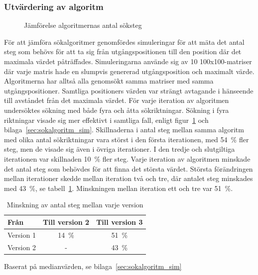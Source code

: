         

        \subsubsection{Utvärdering av algoritm} %
        \label{ssub:utvardering_av_algoritm}
            \begin{figure}[ht!]
                
            \caption{\label{fig:algoritm_steg} Jämförelse algoritmernas antal söksteg}
            \end{figure}

            För att jämföra sökalgoritmer genomfördes simuleringar för att mäta det antal steg som behövs för att ta sig från utgångspositionen till den position där det maximala värdet påträffades. Simuleringarna använde sig av 10 100x100-matriser där varje matris hade en slumpvis genererad utgångsposition och maximalt värde. Algoritmerna har alltså alla genomsökt samma matriser med samma utgångspositioner. Samtliga positioners värden var strängt avtagande i hänseende till avståndet från det maximala värdet. För varje iteration av algoritmen undersöktes sökning med både fyra och åtta sökriktningar. Sökning i fyra riktningar visade sig mer effektivt i samtliga fall, enligt figur~\ref{fig:algoritm_steg} och bilaga~\ref{sec:sokalgoritm_sim}. Skillnaderna i antal steg mellan samma algoritm med olika antal sökriktningar vara störst i den första iterationen, med 54~\% fler steg, men de visade sig även i övriga iterationer. I den tredje och slutgiltiga iterationen var skillnaden 10~\% fler steg. Varje iteration av algoritmen minskade det antal steg som behövdes för att finna det största värdet. Största förändringen mellan iterationer skedde mellan iteration två och tre, där antalet steg minskades med 43~\%, se tabell~\ref{tab:algoritm_forbattring}. Minskningen mellan iteration ett och tre var 51~\%. \bigskip

            \begin{table}[b]
                \caption{\label{tab:algoritm_forbattring}Minskning av antal steg mellan varje version}
                \centering
                \begin{threeparttable}
                \begin{tabular}{@{}lcc@{}}
                \toprule
                Från        & \multicolumn{1}{l}{Till version 2} & \multicolumn{1}{l}{Till version 3} \\ \midrule
                Version 1 & 14~\%                                & 51~\%                                \\
                Version 2 & -                                    & 43~\% \\ \bottomrule
                \end{tabular}
                \begin{tablenotes}
                \item Baserat på medianvärden, se bilaga~\ref{sec:sokalgoritm_sim}
            \end{tablenotes}
            \end{threeparttable}
            \end{table}


